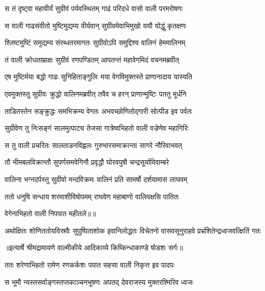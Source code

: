 \twolineshloka
{स तं दृष्ट्वा महावीर्यं सुग्रीवं पर्यवस्थितम्}
{गाढं परिदधे वासो वाली परमरोषणः} %

\twolineshloka
{स वाली गाढसंवीतो मुष्टिमुद्यम्य वीर्यवान्}
{सुग्रीवमेवाभिमुखो ययौ योद्धुं कृतक्षणः} %

\twolineshloka
{श्लिष्टमुष्टिं समुद्यम्य संरब्धतरमागतः}
{सुग्रीवोऽपि समुद्दिश्य वालिनं हेममालिनम्} %

\twolineshloka
{तं वाली क्रोधताम्राक्षः सुग्रीवं रणपण्डितम्}
{आपतन्तं महावेगमिदं वचनमब्रवीत्} %

\twolineshloka
{एष मुष्टिर्मया बद्धो गाढः सुनिहिताङ्गुलिः}
{मया वेगविमुक्तस्ते प्राणानादाय यास्यति} %

\twolineshloka
{एवमुक्तस्तु सुग्रीवः क्रुद्धो वालिनमब्रवीत्}
{तवैव च हरन् प्राणान्मुष्टिः पततु मूर्धनि} %

\twolineshloka
{ताडितस्तेन सङ्क्रुद्धः समभिक्रम्य वेगतः}
{अभवच्छोणितोद्गारी सोत्पीड इव पर्वतः} %

\twolineshloka
{सुग्रीवेण तु निःसङ्गं सालमुत्पाट्य तेजसा}
{गात्रेष्वभिहतो वाली वज्रेणेव महागिरिः} %

\twolineshloka
{स तु वाली प्रचरितः सालताडनविह्वलः}
{गुरुभारसमाक्रान्ता सागरे नौरिवाभवत्} %

\twolineshloka
{तौ भीमबलविक्रान्तौ सुपर्णसमवेगिनौ}
{प्रवृद्धौ घोरवपुषौ चन्द्रसूर्याविवाम्बरे} %

\twolineshloka
{वालिना भग्नदर्पस्तु सुग्रीवो मन्दविक्रमः}
{वालिनं प्रति सामर्षो दर्शयामास लाघवम्} %

\twolineshloka
{ततो धनुषि सन्धाय शरमाशीविषोपमम्}
{राघवेण महाबाणो वालिवक्षसि पातितः} %

{वेगेनाभिहतो वाली निपपात महीतले॥॥} %

\addtocounter{shlokacount}{1}

\fourlineindentedshloka
{अथोक्षितः शोणिततोयविस्रवैः}
{सुपुष्पिताशोक इवानिलोद्धतः}
{विचेतनो वासवसूनुराहवे}
{प्रभ्रंशितेन्द्रध्वजवत्क्षितिं गतः} %


{॥इत्यार्षे श्रीमद्रामायणे वाल्मीकीये आदिकाव्ये किष्किन्धाकाण्डे षोडशः सर्गः॥}


\twolineshloka
{ततः शरेणाभिहतो रामेण रणकर्कशः}
{पपात सहसा वाली निकृत्त इव पादपः} %

\twolineshloka
{स भूमौ न्यस्तसर्वाङ्गस्तप्तकाञ्चनभूषणः}
{अपतद् देवराजस्य मुक्तरश्मिरिव ध्वजः} %

